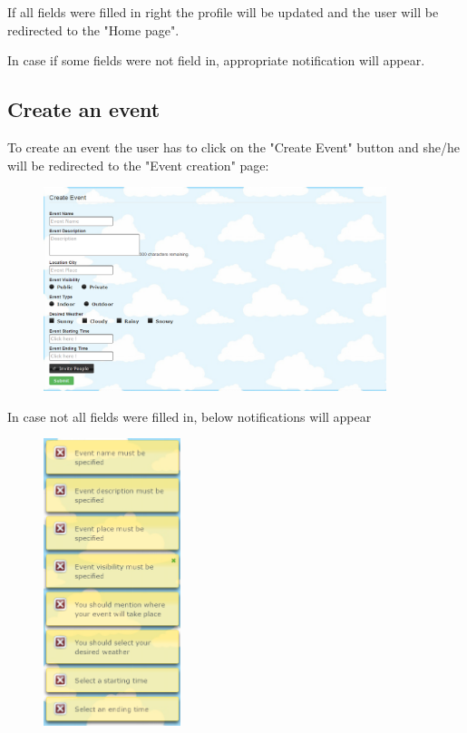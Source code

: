 \par If all fields were filled in right the profile will be updated and the user will be redirected to the "Home page".
\par In case if some fields were not field in, appropriate notification will appear.

\subsection{Create an event}
\par \qquad To create an event the user has to click on the "Create Event" button and she/he will be redirected to the "Event creation" page:
\begin{figure}[tbh]
  \begin{center}
    \includegraphics[width=100mm]{crevent}
  \end{center}
\end{figure}

\newpage
\par In case not all fields were filled in, below notifications will appear
 \begin{figure}[tbh]
  \begin{center}
    \includegraphics[width=40mm]{creventer1}
  \end{center}
\end{figure}

